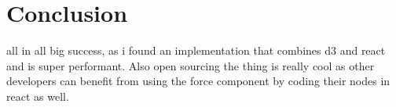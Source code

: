 \chapter{Conclusion}
\label{cha:conclusion}

all in all big success, as i found an implementation that combines d3 and react and is super performant. Also open sourcing the thing is really cool as other developers can benefit from using the force component by coding their nodes in react as well.